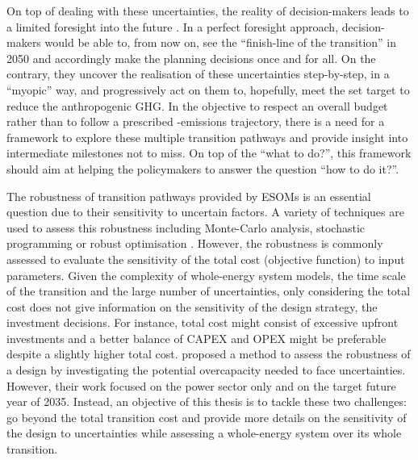 On top of dealing with these uncertainties, the reality of decision-makers leads to a limited foresight into the future \cite{poncelet2016myopic}. In a perfect foresight approach, decision-makers would be able to, from now on, see the ``finish-line of the transition'' in 2050 and accordingly make the planning decisions once and for all. On the contrary, they uncover the realisation of these uncertainties step-by-step, in a ``myopic'' way, and progressively act on them to, hopefully, meet the set target to reduce the anthropogenic \gls{GHG}. In the objective to respect an overall  budget rather than to follow a prescribed -emissions trajectory, there is a need for a framework to explore these multiple transition pathways and provide insight into intermediate milestones not to miss. On top of the ``what to do?'', this framework should aim at helping the policymakers to answer the  question ``how to do it?''.

The robustness of transition pathways provided by ESOMs is an essential question due to their sensitivity to uncertain factors. A variety of techniques are used to assess this robustness including Monte-Carlo analysis, stochastic programming or robust optimisation \cite{yue2018review}. However, the robustness is commonly assessed to evaluate the sensitivity of the total cost (objective function) to input parameters.  Given the complexity of whole-energy system models, the time scale of the transition and the large number of uncertainties, only considering the total cost does not give information on the sensitivity of the design strategy, \ie the investment decisions. For instance, total cost might consist of excessive upfront investments and a better balance of \gls{CAPEX} and \gls{OPEX} might be preferable despite a slightly higher total cost. \citet{moret2020overcapacity} proposed a method to assess the robustness of a design by investigating the potential overcapacity needed to face uncertainties. However, their work focused on the power sector only and on the target future year of 2035.  Instead, an objective of this thesis is to tackle these two challenges: go beyond the total transition cost and provide more details on the sensitivity of the design to uncertainties while assessing a whole-energy system over its whole transition.\\

